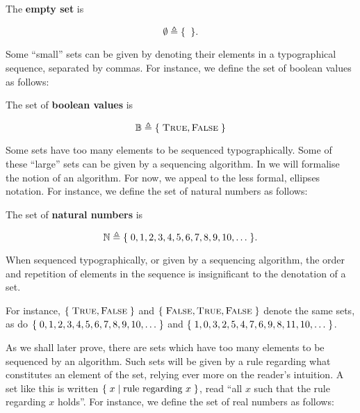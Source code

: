 
\begin{definition} The \textbf{empty set} is

$$\emptyset\triangleq\mathopen{}\left\{\mathrel{}{}\mathrel{}\right\}\mathclose{}.$$

\end{definition}

Some ``small'' sets can be given by denoting their elements in a typographical
sequence, separated by commas. For instance, we define the set of boolean
values as follows:

\begin{definition} The set of \textbf{boolean values} is

$$\mathbb{B}\triangleq\mathopen{}\left\{\mathrel{}{\text{\textsc{True}},\text{\textsc{False}}}\mathrel{}\right\}\mathclose{}$$

\end{definition}

Some sets have too many elements to be sequenced typographically. Some of these
``large'' sets can be given by a sequencing algorithm. In
 we will formalise the notion of an algorithm.
For now, we appeal to the less formal, ellipses notation. For instance, we
define the set of natural numbers as follows:

\begin{definition} The set of \textbf{natural numbers} is

$$\mathbb{N} \triangleq \mathopen{}\left\{\mathrel{}{0,1,2,3,4,5,6,7,8,9,10,\ldots}\mathrel{}\right\}\mathclose{}.$$

\end{definition}

\begin{remark} When sequenced typographically, or given by a sequencing
algorithm, the order and repetition of elements in the sequence is
insignificant to the denotation of a set. \end{remark}

For instance, $\mathopen{}\left\{\mathrel{}{\text{\textsc{True}},\text{\textsc{False}}}\mathrel{}\right\}\mathclose{}$ and $\mathopen{}\left\{\mathrel{}{\text{\textsc{False}}, \text{\textsc{True}}, \text{\textsc{False}}}\mathrel{}\right\}\mathclose{}$
denote the same sets, as do $\mathopen{}\left\{\mathrel{}{0,1,2,3,4,5,6,7,8,9,10,\ldots}\mathrel{}\right\}\mathclose{}$ and
$\mathopen{}\left\{\mathrel{}{1,0,3,2,5,4,7,6,9,8,11,10,\ldots}\mathrel{}\right\}\mathclose{}$.

As we shall later prove, there are sets which have too many elements to be
sequenced by an algorithm.  Such sets will be given by a rule regarding what
constitutes an element of the set, relying ever more on the reader's intuition.
A set like this is written $\mathopen{}\left\{\mathrel{}{x\mathrel{}\mid\mathrel{}{\text{rule regarding $x$}}}\mathrel{}\right\}\mathclose{}$, read ``all
$x$ such that the rule regarding $x$ holds''. For instance, we define the set
of real numbers as follows:

